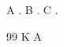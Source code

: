 \documentclass{article}
\begin{document}
A \citet{k}. B \citet{a}. C \citep{k}.
\begin{thebibliography}{99}
 K
 A
\end{thebibliography}
\end{document}
